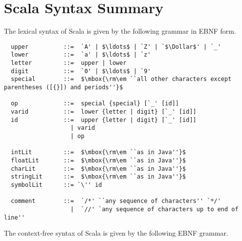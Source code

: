 \documentclass[a4paper,12pt,twoside,titlepage]{book}
\begin{document}
\appendix
\chapter{Scala Syntax Summary}

The lexical syntax of Scala is given by the following grammar in EBNF
form.

\begin{lstlisting}
  upper          ::=  `A' | $\ldots$ | `Z' | `$\Dollar$' | `_'
  lower          ::=  `a' | $\ldots$ | `z'
  letter         ::=  upper | lower
  digit          ::=  `0' | $\ldots$ | `9'
  special        ::=  $\mbox{\rm\em ``all other characters except parentheses ([{}]) and periods''}$

  op             ::=  special {special} [`_' [id]]
  varid          ::=  lower {letter | digit} [`_' [id]]
  id             ::=  upper {letter | digit} [`_' [id]]
                   | varid
                   | op

  intLit         ::=  $\mbox{\rm\em ``as in Java''}$
  floatLit       ::=  $\mbox{\rm\em ``as in Java''}$
  charLit        ::=  $\mbox{\rm\em ``as in Java''}$
  stringLit      ::=  $\mbox{\rm\em ``as in Java''}$
  symbolLit      ::= `\'' id

  comment        ::=  `/*' ``any sequence of characters'' `*/'
                   |  `//' `any sequence of characters up to end of line''
\end{lstlisting}

The context-free syntax of Scala is given by the following EBNF
grammar.
\end{document}
